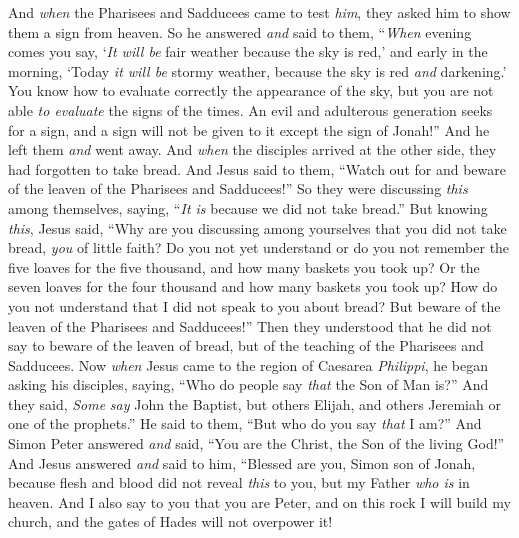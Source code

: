 \begin{biblechapter} %
 And \textit{when} the Pharisees and Sadducees came to test \textit{him}, they asked him to show them a sign from heaven.
\verse So he answered \textit{and} said to them, “\textit{When} evening comes you say, ‘\textit{It will be} fair weather because the sky is red,’
\verse and early in the morning, ‘Today \textit{it will be} stormy weather, because the sky is red \textit{and} darkening.’ You know how to evaluate correctly the appearance of the sky, but you are not able \textit{to evaluate} the signs of the times.
\verse An evil and adulterous generation seeks for a sign, and a sign will not be given to it except the sign of Jonah!” And he left them \textit{and} went away.
 And \textit{when} the disciples arrived at the other side, they had forgotten to take bread.
\verse And Jesus said to them, “Watch out for and beware of the leaven of the Pharisees and Sadducees!”
\verse So they were discussing \textit{this} among themselves, saying, “\textit{It is} because we did not take bread.”
\verse But knowing \textit{this}, Jesus said, “Why are you discussing among yourselves that you did not take bread, \textit{you} of little faith?
\verse Do you not yet understand or do you not remember the five loaves for the five thousand, and how many baskets you took up?
\verse Or the seven loaves for the four thousand and how many baskets you took up?
\verse How do you not understand that I did not speak to you about bread? But beware of the leaven of the Pharisees and Sadducees!”
\verse Then they understood that he did not say to beware of the leaven of bread, but of the teaching of the Pharisees and Sadducees.
 Now \textit{when} Jesus came to the region of Caesarea \textit{Philippi}, he began asking his disciples, saying, “Who do people say \textit{that} the Son of Man is?”
\verse And they said, \textit{Some} \textit{say} John the Baptist, but others Elijah, and others Jeremiah or one of the prophets.”
\verse He said to them, “But who do you say \textit{that} I am?”
\verse And Simon Peter answered \textit{and} said, “You are the Christ, the Son of the living God!”
\verse And Jesus answered \textit{and} said to him, “Blessed are you, Simon son of Jonah, because flesh and blood did not reveal \textit{this} to you, but my Father \textit{who is} in heaven.
\verse And I also say to you that you are Peter, and on this rock I will build my church, and the gates of Hades will not overpower it!

\end{biblechapter}
